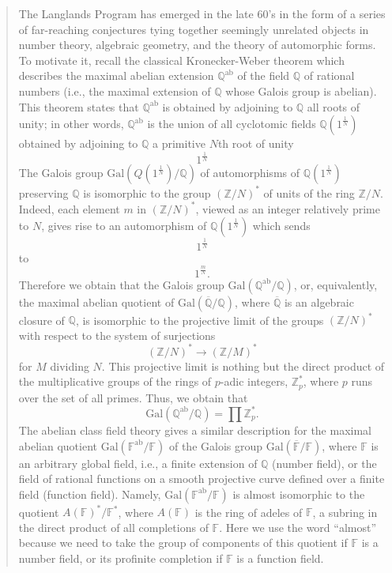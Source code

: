 \documentclass{article}
\begin{document}
\begin{quote}
The Langlands Program has emerged in the late 60's in the form of a
series of far-reaching conjectures tying together seemingly unrelated
objects in number theory, algebraic geometry, and the theory of
automorphic forms. To motivate it, recall the classical Kronecker-Weber
theorem which describes the maximal abelian extension
\(\mathbb{Q}^{\mathrm{ab}}\) of the field \(\mathbb{Q}\) of rational
numbers (i.e., the maximal extension of \(\mathbb{Q}\) whose Galois
group is abelian). This theorem states that \(\mathbb{Q}^{\mathrm{ab}}\)
is obtained by adjoining to \(\mathbb{Q}\) all roots of unity; in other
words, \(\mathbb{Q}^{\mathrm{ab}}\) is the union of all cyclotomic
fields \(\mathbb{Q}(1^{\frac1N})\) obtained by adjoining to
\(\mathbb{Q}\) a primitive \(N\)th root of unity \[1^{\frac1N}\] The
Galois group \(\mathrm{Gal}(Q(1^{\frac1N})/\mathbb{Q})\) of
automorphisms of \(\mathbb{Q}(1^{\frac1N})\) preserving \(\mathbb{Q}\)
is isomorphic to the group \((\mathbb{Z}/N)^*\) of units of the ring
\(\mathbb{Z}/N\). Indeed, each element \(m\) in \((\mathbb{Z}/N)^*\),
viewed as an integer relatively prime to \(N\), gives rise to an
automorphism of \(\mathbb{Q}(1^{\frac1N})\) which sends \[1^{\frac1N}\]
to \[1^{\frac{m}{N}}.\] Therefore we obtain that the Galois group
\(\mathrm{Gal}(\mathbb{Q}^{\mathrm{ab}}/\mathbb{Q})\), or, equivalently,
the maximal abelian quotient of
\(\mathrm{Gal}(\overline{\mathbb{Q}}/\mathbb{Q})\), where
\(\overline{\mathbb{Q}}\) is an algebraic closure of \(\mathbb{Q}\), is
isomorphic to the projective limit of the groups \((\mathbb{Z}/N)^*\)
with respect to the system of surjections
\[(\mathbb{Z}/N)^* \to (\mathbb{Z}/M)^*\] for \(M\) dividing \(N\). This
projective limit is nothing but the direct product of the multiplicative
groups of the rings of \(p\)-adic integers, \(\mathbb{Z}_p^*\), where
\(p\) runs over the set of all primes. Thus, we obtain that
\[\mathrm{Gal}(\mathbb{Q}^{\mathrm{ab}}/\mathbb{Q}) = \prod \mathbb{Z}_p^*.\]
The abelian class field theory gives a similar description for the
maximal abelian quotient
\(\mathrm{Gal}(\mathbb{F}^{\mathrm{ab}}/\mathbb{F})\) of the Galois
group \(\mathrm{Gal}(\overline{\mathbb{F}}/\mathbb{F})\), where
\(\mathbb{F}\) is an arbitrary global field, i.e., a finite extension of
\(\mathbb{Q}\) (number field), or the field of rational functions on a
smooth projective curve defined over a finite field (function field).
Namely, \(\mathrm{Gal}(\mathbb{F}^{\mathrm{ab}}/\mathbb{F})\) is almost
isomorphic to the quotient \(A(\mathbb{F})^*/\mathbb{F}^*\), where
\(A(\mathbb{F})\) is the ring of adeles of \(\mathbb{F}\), a subring in
the direct product of all completions of \(\mathbb{F}\). Here we use the
word ``almost'' because we need to take the group of components of this
quotient if \(\mathbb{F}\) is a number field, or its profinite
completion if \(\mathbb{F}\) is a function field.


\end{quote}
\end{document}
